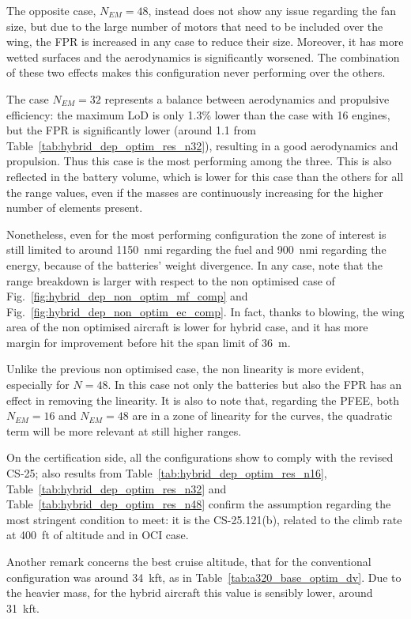 The opposite case, $N_{EM}=48$, instead does not show any issue regarding the fan size, but due to the large number of motors that need to be included over the wing, the FPR is increased in any case to reduce their size. 
Moreover, it has more wetted surfaces and the aerodynamics is significantly worsened.
The combination of these two effects makes this configuration never performing over the others. 

The case $N_{EM}=32$ represents a balance between aerodynamics and propulsive efficiency: the maximum LoD is only 1.3\% lower than the case with 16 engines, but the FPR is significantly lower (around 1.1 from Table~\ref{tab:hybrid_dep_optim_res_n32}), resulting in a good aerodynamics and propulsion. 
Thus this case is the most performing among the three. 
This is also reflected in the battery volume, which is lower for this case than the others for all the range values, even if the masses are continuously increasing for the higher number of elements present. 

Nonetheless, even for the most performing configuration the zone of interest is still limited to around 1150~nmi regarding the fuel and 900~nmi regarding the energy, because of the batteries' weight divergence. 
In any case, note that the range breakdown is larger with respect to the non optimised case of Fig.~\ref{fig:hybrid_dep_non_optim_mf_comp} and Fig.~\ref{fig:hybrid_dep_non_optim_ec_comp}. 
In fact, thanks to blowing, the wing area of the non optimised aircraft is lower for hybrid case, and it has more margin for improvement before hit the span limit of 36~\si{\meter}. 

Unlike the previous non optimised case, the non linearity is more evident, especially for $N=48$. 
In this case not only the batteries but also the FPR has an effect in removing the linearity. 
It is also to note that, regarding the PFEE, both $N_{EM}=16$ and $N_{EM}=48$ are in a zone of linearity for the curves, the quadratic term will be more relevant at still higher ranges.  

On the certification side, all the configurations show to comply with the revised CS-25; also results from Table~\ref{tab:hybrid_dep_optim_res_n16}, Table~\ref{tab:hybrid_dep_optim_res_n32} and Table~\ref{tab:hybrid_dep_optim_res_n48} confirm the assumption regarding the most stringent condition to meet: it is the CS-25.121(b), related to the climb rate at 400~ft of altitude and in OCI case. 

Another remark concerns the best cruise altitude, that for the conventional configuration was around 34~kft, as in Table~\ref{tab:a320_base_optim_dv}. 
Due to the heavier mass, for the hybrid aircraft this value is sensibly lower, around 31~kft. 

